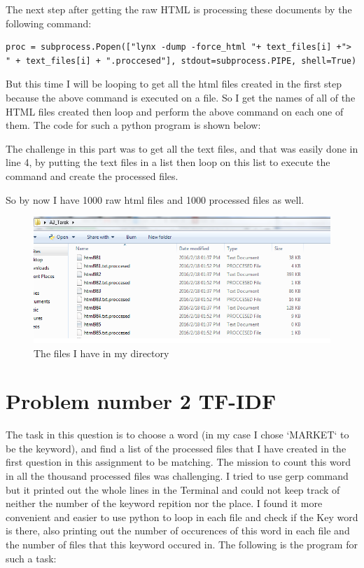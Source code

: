 \documentclass{article}
\begin{document}
The next step after getting the raw HTML is processing these documents by the following command:
 \begin{lstlisting}
proc = subprocess.Popen(["lynx -dump -force_html "+ text_files[i] +"> " + text_files[i] + ".proccesed"], stdout=subprocess.PIPE, shell=True)
\end{lstlisting}
But this time I will be looping to get all the html files created in the first step because the above command is executed on a file.
So I get the names of all of the HTML files created then loop and perform the above command on each one of them. The code for such a python program is shown below:

The challenge in this part was to get all the text files, and that was easily done in line 4, by putting the text files in a list then loop on this list to execute the command and create the processed files.

So by now I have 1000 raw html files and 1000 processed files as well.
\newpage
\begin{figure}
\centering
\includegraphics[scale=0.95]{fig.png}
\caption{The files I have in my directory}
\label{fig:fig.png}
\end{figure}


\newpage
\section{Problem number 2 TF-IDF}

The task in this question is to choose a word (in my case I chose `MARKET` to be the keyword), and find a list of the processed files that I have created in the first question in this assignment to be matching. The mission to count this word in all the thousand processed files was challenging. I tried to use gerp command but it printed out the whole lines in the Terminal and could not keep track of neither the number of the keyword repition nor the place.
\newpage
I found it more convenient and easier to use python to loop in each file and check if the Key word is there, also printing out the number of occurences of this word in each file and the number of files that this keyword occured in. The following is the program for such a task:
\end{document}

